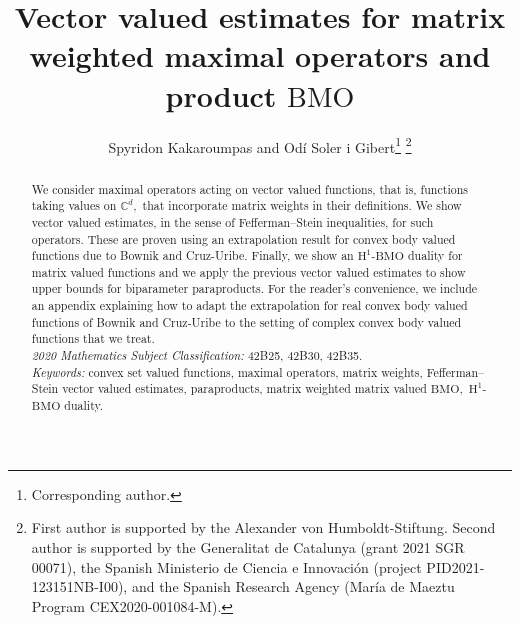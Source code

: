 \documentclass{article}
\theoremstyle{definition}
\theoremstyle{remark}
\numberwithin{equation}{section}
\newcommand{\complex}{\mathbb{C}}
\newcommand{\1}{\mathbf{1}}
\begin{document}
    \title{Vector valued estimates for matrix weighted maximal operators and
           product \texorpdfstring{$\mathrm{BMO}$}{BMO}}

    \author{Spyridon Kakaroumpas
            and Od{\'i} Soler i Gibert\footnote{Corresponding author.}
            \thanks{First author is supported by the Alexander von Humboldt-Stiftung.
            Second author is supported by
            the Generalitat de Catalunya (grant 2021 SGR 00071),
            the Spanish Ministerio de Ciencia e Innovaci\'{o}n (project PID2021-123151NB-I00),
            and the Spanish Research Agency (Mar\'{i}a de Maeztu Program CEX2020-001084-M).}}

    \date{}

    \maketitle

    \begin{abstract}
        We consider maximal operators acting on vector valued functions,
        that is, functions taking values on $\complex^d,$
        that incorporate matrix weights in their definitions.
        We show vector valued estimates, in the sense of Fefferman--Stein inequalities,
        for such operators.
        These are proven using an extrapolation result for convex body valued functions
        due to Bownik and Cruz-Uribe.
        Finally, we show an $\mathrm{H}^1$-$\mathrm{BMO}$ duality for matrix valued functions
        and we apply the previous vector valued estimates to show upper bounds
        for biparameter paraproducts.
        For the reader's convenience, we include an appendix explaining how to
        adapt the extrapolation for real convex body valued functions of Bownik and Cruz-Uribe
        to the setting of complex convex body valued functions that we treat.\\
        \textit{2020 Mathematics Subject Classification:} 42B25, 42B30, 42B35.\\
        \textit{Keywords:} convex set valued functions, maximal operators,
                           matrix weights, Fefferman--Stein vector valued estimates,
                           paraproducts, matrix weighted matrix valued $\mathrm{BMO},$
                           $\mathrm{H}^1$-$\mathrm{BMO}$ duality.
    \end{abstract}
\end{document}
